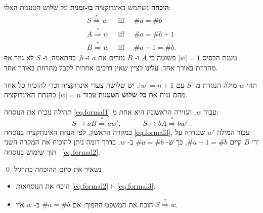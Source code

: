 \textbf{הוכחה}
נשתמש באינדוקציה
\textbf{בו-זמנית}
על שלוש הטענות האלו:
\begin{eqnarray}
S \stackrel{*}{\Rightarrow} w &\;\;\mathrm{iff}\;\;& \#a = \#b\label{eq.formal1}\\
A \stackrel{*}{\Rightarrow} w &\;\;\mathrm{iff}\;\;& \#a = \#b+1\label{eq.formal2}\\
B \stackrel{*}{\Rightarrow} w &\;\;\mathrm{iff}\;\;& \#a+1 = \#b.\label{eq.formal3}
\end{eqnarray}
טענת הבסיס
$|w|=1$
פשוטה כי
$A$
ו-%
$B$
גוזרים את
$a$
ו-%
$b$,
בהתאמה, ו-%
$S$
לא גוזר אף מחרוזת באורך אחד. עלינו לציין שאין דרכים אחרות לקבל מחרוזת באורך אחד.

תהי 
$w$
מילה הנגזרת מ-%
$S$
עם 
$|w|=n+1$.
יש שלושה צעדי אינדוקציה וכדי להוכיח כל אחד מהם נניח את
\textbf{כל שלוש הטענות}
עבור 
$|w|=n$
כהנחת האינדוקציה.

תחילה נוכיח את הנוסחה
\ref{eq.formal1}
עבור
$w$.
הגזירה הראשונה היא אחת מ:
\[
S\rightarrow aB \stackrel{*}{\Rightarrow} aw',\hspace{3em} S\rightarrow bA\stackrel{*}{\Rightarrow} bw'\,.
\]
במקרה הראשון, לפי הנחת האינדוקציה בנוסחה
\ref{eq.formal3},
עבור המילה
$w'$ 
שנגדרה על ידי
$B$
קיים
$\#a+1=\#b$,
כך ש-%
$\#a=\#b$
ב-%
$w$.
בדרך דומה ניתן להוכיח את המקרה השני תוך שימוש בנוסחה~
\ref{eq.formal2}.

נשאיר את סיום ההוכחה כתרגיל.
\qed

\begin{exercise}\mbox{}
\begin{itemize}
\item
הוכח את הנוסחאות
\ref{eq.formal2}
ו-%
\ref{eq.formal3}.
\item
הוכח את המשפט ההפוך: אם
$\#a=\#b$
ב-%
$w$
אזי
$S \stackrel{*}{\Rightarrow} w$.
\end{itemize}
\end{exercise}

